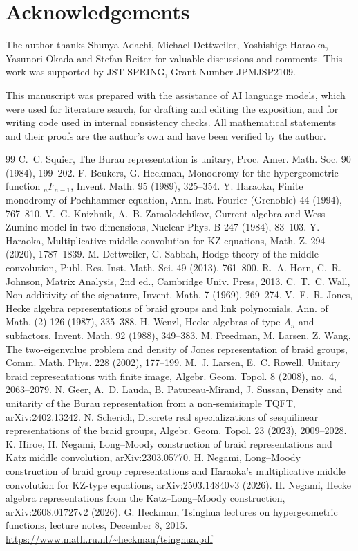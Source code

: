 \documentclass[11pt]{article}
\theoremstyle{definition}
\begin{document}
\section*{Acknowledgements}
The author thanks Shunya Adachi, Michael Dettweiler, Yoshishige
Haraoka, Yasunori Okada and Stefan Reiter for valuable discussions
and comments. This work was supported by JST SPRING, Grant Number
JPMJSP2109.

This manuscript was prepared with the assistance of AI language
models, which were used for literature search, for drafting and
editing the exposition, and for writing code used in internal
consistency checks. All mathematical statements and their proofs are
the author's own and have been verified by the author.


\begin{thebibliography}{99}
 C.~C. Squier, The Burau representation is unitary,
Proc. Amer. Math. Soc. 90 (1984), 199--202.
 F. Beukers, G. Heckman, Monodromy for the hypergeometric
function ${}_nF_{n-1}$, Invent. Math. 95 (1989), 325--354.
 Y. Haraoka, Finite monodromy of Pochhammer
equation, Ann. Inst. Fourier (Grenoble) 44 (1994), 767--810.
 V.~G. Knizhnik, A.~B. Zamolodchikov, Current algebra and
Wess--Zumino model in two dimensions, Nuclear Phys. B 247 (1984),
83--103.
 Y. Haraoka, Multiplicative middle convolution
for KZ equations, Math. Z. 294 (2020), 1787--1839.
 M. Dettweiler, C. Sabbah, Hodge theory of the middle
convolution, Publ. Res. Inst. Math. Sci. 49 (2013), 761--800.
 R.~A. Horn, C.~R. Johnson, Matrix Analysis, 2nd ed.,
Cambridge Univ. Press, 2013.
 C.~T.~C. Wall, Non-additivity of the signature,
Invent. Math. 7 (1969), 269--274.
 V.~F.~R. Jones, Hecke algebra representations of
braid groups and link polynomials, Ann. of Math. (2) 126 (1987),
335--388.
 H. Wenzl, Hecke algebras of type $A_n$ and
subfactors, Invent. Math. 92 (1988), 349--383. %
 M. Freedman, M. Larsen, Z. Wang, The two-eigenvalue
problem and density of Jones representation of braid groups, Comm.
Math. Phys. 228 (2002), 177--199. %
 M.~J. Larsen, E.~C. Rowell, Unitary braid
representations with finite image, Algebr. Geom. Topol. 8 (2008),
no.~4, 2063--2079.
 N. Geer, A.~D. Lauda, B. Patureau-Mirand, J. Sussan,
Density and unitarity of the Burau representation from a
non-semisimple TQFT, arXiv:2402.13242. %
 N. Scherich, Discrete real specializations of
sesquilinear representations of the braid groups, Algebr. Geom.
Topol. 23 (2023), 2009--2028.
 K. Hiroe, H. Negami, Long--Moody construction of braid
representations and Katz middle convolution, arXiv:2303.05770.
 H. Negami, Long--Moody construction of braid group
representations and Haraoka's multiplicative middle convolution for
KZ-type equations, arXiv:2503.14840v3 (2026). %
 H. Negami, Hecke algebra representations from the
Katz--Long--Moody construction, arXiv:2608.01727v2 (2026).
 G. Heckman, Tsinghua lectures on
hypergeometric functions, lecture notes, December 8, 2015.
\url{https://www.math.ru.nl/~heckman/tsinghua.pdf}
\end{thebibliography}
\end{document}
